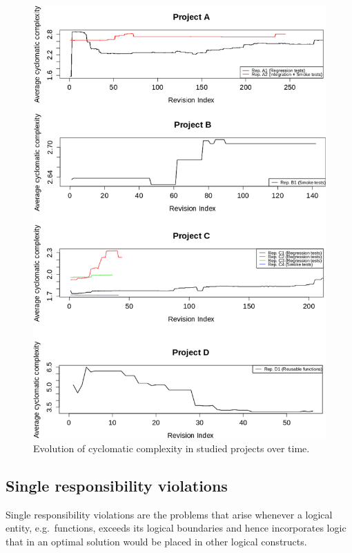\begin{figure}[!htbp]
    \centering
    \includegraphics[width=\textwidth,keepaspectratio]{figure/results/rq1/avg-complexity-together.pdf}
    \caption{Evolution of cyclomatic complexity in studied projects over time.}
    \label{fig:avg-complexity-together}
\end{figure}


\subsection{Single responsibility violations}
    Single responsibility violations are the problems that arise whenever a logical entity, e.g.\ functions, exceeds its logical boundaries and hence incorporates logic that in an optimal solution would be placed in other logical constructs.

